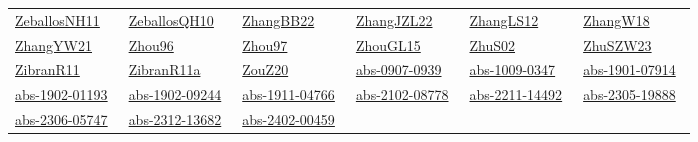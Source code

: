 \begin{longtable}{*{6}{l}}
\href{../works/ZeballosNH11.pdf}{ZeballosNH11}~\cite{ZeballosNH11} & \href{../works/ZeballosQH10.pdf}{ZeballosQH10}~\cite{ZeballosQH10} & \href{../works/ZhangBB22.pdf}{ZhangBB22}~\cite{ZhangBB22} & \href{../works/ZhangJZL22.pdf}{ZhangJZL22}~\cite{ZhangJZL22} & \href{../works/ZhangLS12.pdf}{ZhangLS12}~\cite{ZhangLS12} & \href{../works/ZhangW18.pdf}{ZhangW18}~\cite{ZhangW18}\\ 
\href{../works/ZhangYW21.pdf}{ZhangYW21}~\cite{ZhangYW21} & \href{../works/Zhou96.pdf}{Zhou96}~\cite{Zhou96} & \href{../works/Zhou97.pdf}{Zhou97}~\cite{Zhou97} & \href{../works/ZhouGL15.pdf}{ZhouGL15}~\cite{ZhouGL15} & \href{../works/ZhuS02.pdf}{ZhuS02}~\cite{ZhuS02} & \href{../works/ZhuSZW23.pdf}{ZhuSZW23}~\cite{ZhuSZW23}\\ 
\href{../works/ZibranR11.pdf}{ZibranR11}~\cite{ZibranR11} & \href{../works/ZibranR11a.pdf}{ZibranR11a}~\cite{ZibranR11a} & \href{../works/ZouZ20.pdf}{ZouZ20}~\cite{ZouZ20} & \href{../works/abs-0907-0939.pdf}{abs-0907-0939}~\cite{abs-0907-0939} & \href{../works/abs-1009-0347.pdf}{abs-1009-0347}~\cite{abs-1009-0347} & \href{../works/abs-1901-07914.pdf}{abs-1901-07914}~\cite{abs-1901-07914}\\ 
\href{../works/abs-1902-01193.pdf}{abs-1902-01193}~\cite{abs-1902-01193} & \href{../works/abs-1902-09244.pdf}{abs-1902-09244}~\cite{abs-1902-09244} & \href{../works/abs-1911-04766.pdf}{abs-1911-04766}~\cite{abs-1911-04766} & \href{../works/abs-2102-08778.pdf}{abs-2102-08778}~\cite{abs-2102-08778} & \href{../works/abs-2211-14492.pdf}{abs-2211-14492}~\cite{abs-2211-14492} & \href{../works/abs-2305-19888.pdf}{abs-2305-19888}~\cite{abs-2305-19888}\\ 
\href{../works/abs-2306-05747.pdf}{abs-2306-05747}~\cite{abs-2306-05747} & \href{../works/abs-2312-13682.pdf}{abs-2312-13682}~\cite{abs-2312-13682} & \href{../works/abs-2402-00459.pdf}{abs-2402-00459}~\cite{abs-2402-00459} & \end{longtable}
